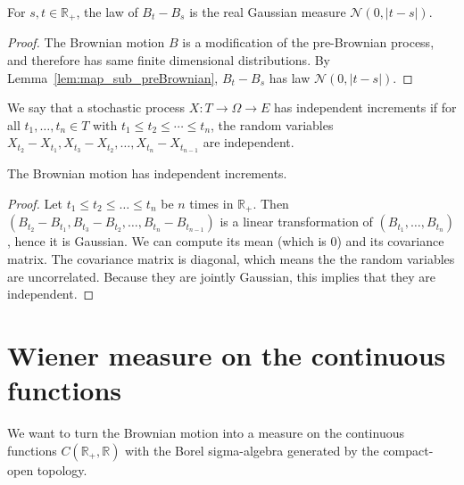 \begin{lemma}\label{lem:measurePreserving_brownian_sub}
  \leanok
For $s, t \in \mathbb{R}_+$, the law of $B_t - B_s$ is the real Gaussian measure $\mathcal{N}(0,\vert t - s \vert)$.
\end{lemma}

\begin{proof}\leanok
The Brownian motion $B$ is a modification of the pre-Brownian process, and therefore has same finite dimensional distributions. By Lemma~\ref{lem:map_sub_preBrownian}, $B_t - B_s$ has law $\mathcal{N}(0,\vert t - s \vert)$.
\end{proof}


\begin{definition}\label{def:HasIndependentIncrements}
We say that a stochastic process $X : T \to \Omega \to E$ has independent increments if for all $t_1, \ldots, t_n \in T$ with $t_1 \le t_2 \le \cdots \le t_n$, the random variables $X_{t_2} - X_{t_1}, X_{t_3} - X_{t_2}, \ldots, X_{t_n} - X_{t_{n-1}}$ are independent.
\end{definition}


\begin{lemma}\label{lem:hasIndependentIncrements_brownian}
The Brownian motion has independent increments.
\end{lemma}

\begin{proof}
Let $t_1 \le t_2 \le \ldots \le t_n$ be $n$ times in $\mathbb{R}_+$.
Then $(B_{t_2} - B_{t_1}, B_{t_3} - B_{t_2}, \ldots, B_{t_n} - B_{t_{n-1}})$ is a linear transformation of $(B_{t_1}, \ldots, B_{t_n})$, hence it is Gaussian.
We can compute its mean (which is $0$) and its covariance matrix.
The covariance matrix is diagonal, which means the the random variables are uncorrelated.
Because they are jointly Gaussian, this implies that they are independent.
\end{proof}


\section{Wiener measure on the continuous functions}

We want to turn the Brownian motion into a measure on the continuous functions $C(\mathbb{R}_+, \mathbb{R})$ with the Borel sigma-algebra generated by the compact-open topology.


